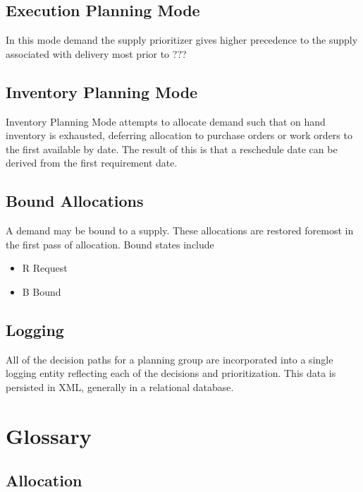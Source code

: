 \documentclass[letterpaper,10pt,english]{sphinxmanual}
\begin{document}
\section{Execution Planning Mode}
\label{APS/Functional:execution-planning-mode}
In this mode demand the supply prioritizer gives higher precedence to
the supply associated with delivery most prior to ???


\section{Inventory Planning Mode}
\label{APS/Functional:inventory-planning-mode}
Inventory Planning Mode attempts to allocate demand such that on hand
inventory is exhausted, deferring allocation to purchase orders or work
orders to the first available by date. The result of this is that a
reschedule date can be derived from the first requirement date.


\section{Bound Allocations}
\label{APS/Functional:bound-allocations}
A demand may be bound to a supply. These allocations are restored
foremost in the first pass of allocation. Bound states include
\begin{itemize}
\item {} 
R Request

\item {} 
B Bound

\end{itemize}


\section{Logging}
\label{APS/Functional:logging}
All of the decision paths for a planning group are incorporated into a
single logging entity reflecting each of the decisions and
prioritization. This data is persisted in XML, generally in a relational
database.


\chapter{Glossary}
\label{APS/Glossary:glossary}\label{APS/Glossary::doc}

\section{Allocation}
\label{APS/Glossary:allocation}
\end{document}
